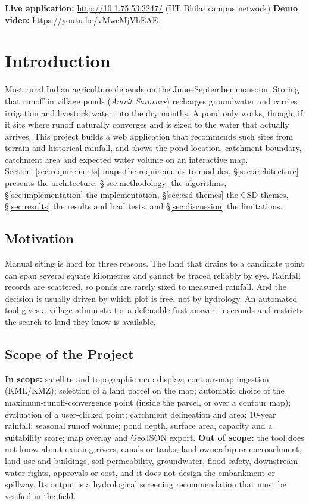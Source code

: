 \documentclass[manuscript,screen,review]{acmart}
\begin{document}
\noindent\textbf{Live application:} \url{http://10.1.75.53:3247/} (IIT Bhilai campus network) \quad \textbf{Demo video:} \url{https://youtu.be/vMweMjVhEAE}

\section{Introduction}
\label{sec:intro}
Most rural Indian agriculture depends on the June--September monsoon. Storing that runoff in village ponds (\textit{Amrit Sarovars}) recharges groundwater and carries irrigation and livestock water into the dry months. A pond only works, though, if it sits where runoff naturally converges and is sized to the water that actually arrives. This project builds a web application that recommends such sites from terrain and historical rainfall, and shows the pond location, catchment boundary, catchment area and expected water volume on an interactive map. Section~\ref{sec:requirements} maps the requirements to modules, \S\ref{sec:architecture} presents the architecture, \S\ref{sec:methodology} the algorithms, \S\ref{sec:implementation} the implementation, \S\ref{sec:csd-themes} the CSD themes, \S\ref{sec:results} the results and load tests, and \S\ref{sec:discussion} the limitations.

\subsection{Motivation}
Manual siting is hard for three reasons. The land that drains to a candidate point can span several square kilometres and cannot be traced reliably by eye. Rainfall records are scattered, so ponds are rarely sized to measured rainfall. And the decision is usually driven by which plot is free, not by hydrology. An automated tool gives a village administrator a defensible first answer in seconds and restricts the search to land they know is available.

\subsection{Scope of the Project}
\textbf{In scope:} satellite and topographic map display; contour-map ingestion (KML/KMZ); selection of a land parcel on the map; automatic choice of the maximum-runoff-convergence point (inside the parcel, or over a contour map); evaluation of a user-clicked point; catchment delineation and area; 10-year rainfall; seasonal runoff volume; pond depth, surface area, capacity and a suitability score; map overlay and GeoJSON export.
\textbf{Out of scope:} the tool does not know about existing rivers, canals or tanks, land ownership or encroachment, land use and buildings, soil permeability, groundwater, flood safety, downstream water rights, approvals or cost, and it does not design the embankment or spillway. Its output is a hydrological screening recommendation that must be verified in the field.
\end{document}
